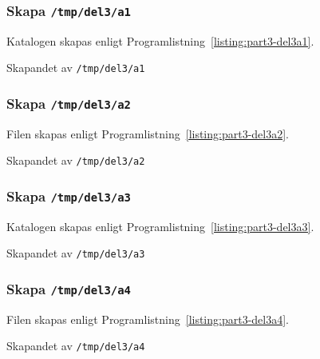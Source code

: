\subsubsection{Skapa \texttt{/tmp/del3/a1}}
Katalogen skapas enligt Programlistning~\ref{listing:part3-del3a1}.

\begin{listing}[H]
\caption{Skapandet av \texttt{/tmp/del3/a1}}
\label{listing:part3-del3a1}
\end{listing}

\subsubsection{Skapa \texttt{/tmp/del3/a2}}
Filen skapas enligt Programlistning~\ref{listing:part3-del3a2}.

\begin{listing}[H]
\caption{Skapandet av \texttt{/tmp/del3/a2}}
\label{listing:part3-del3a2}
\end{listing}

\subsubsection{Skapa \texttt{/tmp/del3/a3}}
Katalogen skapas enligt Programlistning~\ref{listing:part3-del3a3}.

\begin{listing}[H]
\caption{Skapandet av \texttt{/tmp/del3/a3}}
\label{listing:part3-del3a3}
\end{listing}

\subsubsection{Skapa \texttt{/tmp/del3/a4}}
Filen skapas enligt Programlistning~\ref{listing:part3-del3a4}.

\begin{listing}[H]
\caption{Skapandet av \texttt{/tmp/del3/a4}}
\label{listing:part3-del3a4}
\end{listing}

